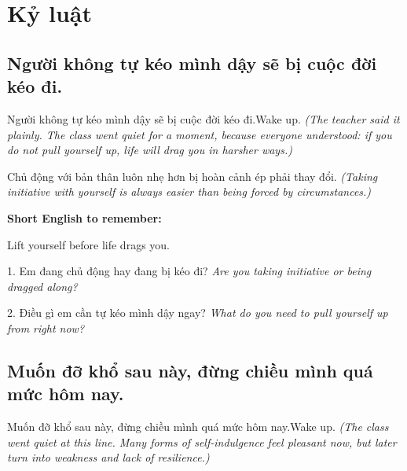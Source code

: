 \chapter{Kỷ luật}

\section{Người không tự kéo mình dậy sẽ bị cuộc đời kéo đi.}
\begin{truyen}{Người không tự kéo mình dậy sẽ bị cuộc đời kéo đi.}{Wake up.}
\textit{(The teacher said it plainly. The class went quiet for a moment, because everyone understood: if you do not pull yourself up, life will drag you in harsher ways.)}
\end{truyen}

\begin{baihoc}
Chủ động với bản thân luôn nhẹ hơn bị hoàn cảnh ép phải thay đổi.
\textit{(Taking initiative with yourself is always easier than being forced by circumstances.)}
\end{baihoc}

\begin{ghinhoanh}
\textbf{Short English to remember:}

Lift yourself before life drags you.

\end{ghinhoanh}

\begin{tuhocnhanh}
1. Em đang chủ động hay đang bị kéo đi? \textit{Are you taking initiative or being dragged along?}

2. Điều gì em cần tự kéo mình dậy ngay? \textit{What do you need to pull yourself up from right now?}
\end{tuhocnhanh}
\ngancach

\section{Muốn đỡ khổ sau này, đừng chiều mình quá mức hôm nay.}
\begin{truyen}{Muốn đỡ khổ sau này, đừng chiều mình quá mức hôm nay.}{Wake up.}
\textit{(The class went quiet at this line. Many forms of self-indulgence feel pleasant now, but later turn into weakness and lack of resilience.)}
\end{truyen}

